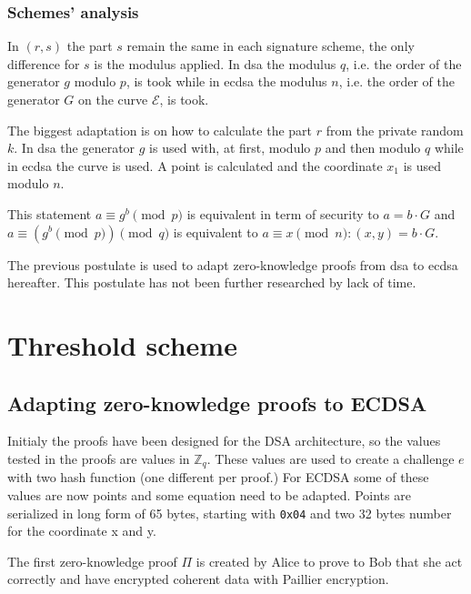\subsubsection{Schemes' analysis}

In $(r, s)$ the part $s$ remain the same in each signature scheme, the only difference
for $s$ is the modulus applied. In \gls{dsa} the modulus $q$, i.e. the order of
the generator $g$ modulo $p$, is took while in \gls{ecdsa} the modulus $n$, i.e. the
order of the generator $G$ on the curve $\mathcal{E}$, is took.

The biggest adaptation is on how to calculate the part $r$ from the private random $k$.
In \gls{dsa} the generator $g$ is used with, at first, modulo $p$ and then
modulo $q$ while in \gls{ecdsa} the curve is used. A point is calculated and the
coordinate $x_1$ is used modulo $n$.

\begin{postulate}
  This statement $a \equiv g^b \pmod p$ is equivalent in term of security to $a = b \cdot G$
  and $a \equiv (g^b \pmod p) \pmod q$ is equivalent to $a \equiv x \pmod n : (x, y) = b \cdot G$.
\end{postulate}

The previous postulate is used to adapt zero-knowledge proofs from \gls{dsa} to
\gls{ecdsa} hereafter. This postulate has not been further researched by lack
of time.


\section{Threshold scheme}


\subsection{Adapting zero-knowledge proofs to ECDSA}

Initialy the proofs have been designed for the DSA architecture, so the values
tested in the proofs are values in $\mathbb{Z}_{q}$. These values are used to create
a challenge $e$ with two hash function (one different per proof.) For ECDSA some
of these values are now points and some equation need to be adapted. Points are
serialized in long form of 65 bytes, starting with \texttt{0x04} and two 32 bytes
number for the coordinate x and y.

The first zero-knowledge proof $\Pi$ is created by Alice to prove to Bob that she
act correctly and have encrypted coherent data with Paillier encryption.


